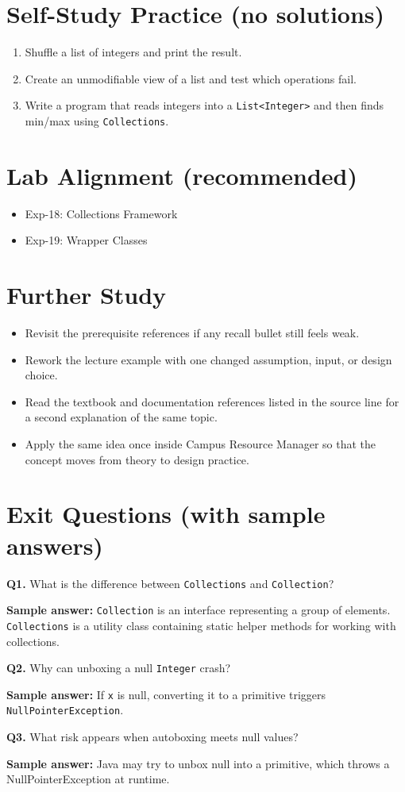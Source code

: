 \documentclass[11pt]{article}
\begin{document}
\section{Self-Study Practice (no solutions)}
\begin{enumerate}
  \item Shuffle a list of integers and print the result.
  \item Create an unmodifiable view of a list and test which operations fail.
  \item Write a program that reads integers into a \texttt{List<Integer>} and then finds min/max using \texttt{Collections}.
\end{enumerate}

\section{Lab Alignment (recommended)}
\begin{itemize}
  \item Exp-18: Collections Framework
  \item Exp-19: Wrapper Classes
\end{itemize}

\section{Further Study}
\begin{itemize}
  \item Revisit the prerequisite references if any recall bullet still feels weak.
  \item Rework the lecture example with one changed assumption, input, or design choice.
  \item Read the textbook and documentation references listed in the source line for a second explanation of the same topic.
  \item Apply the same idea once inside Campus Resource Manager so that the concept moves from theory to design practice.
\end{itemize}
\notesources{\OOPSUnitVSources}

\section{Exit Questions (with sample answers)}
\textbf{Q1.} What is the difference between \texttt{Collections} and \texttt{Collection}?\par
\textbf{Sample answer:} \texttt{Collection} is an interface representing a group of elements. \texttt{Collections} is a utility class containing static helper methods for working with collections.

\vspace{0.6em}
\textbf{Q2.} Why can unboxing a null \texttt{Integer} crash?\par
\textbf{Sample answer:} If \texttt{x} is null, converting it to a primitive triggers \texttt{NullPointerException}.

\vspace{0.6em}
\textbf{Q3.} What risk appears when autoboxing meets null values?\par
\textbf{Sample answer:} Java may try to unbox null into a primitive, which throws a NullPointerException at runtime.
\end{document}
